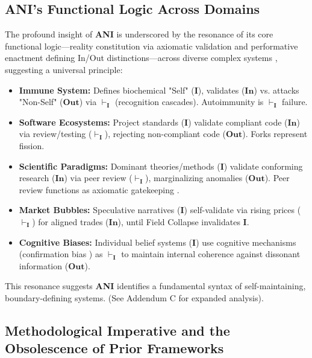 \documentclass{article}
\newcommand{\ANI}{\textbf{ANI}}             %
\newcommand{\Isness}{\mathbf{I}}            %
\newcommand{\Inness}{\mathbf{In}}           %
\newcommand{\Outness}{\mathbf{Out}}         %
\newcommand{\validates}[1]{\ensuremath{\vdash_{#1}}} %
\begin{document}
\subsection{ANI's Functional Logic Across Domains}

The profound insight of \ANI{} is underscored by the resonance of its core functional logic—reality constitution via axiomatic validation and performative enactment defining In/Out distinctions—across diverse complex systems \citep{Bateson1972, Luhmann1995}, suggesting a universal principle:
\begin{itemize}
    \item \textbf{Immune System:} Defines biochemical "Self" ($\Isness$), validates ($\Inness$) vs. attacks "Non-Self" ($\Outness$) via $\validates{\Isness}$ (recognition cascades). Autoimmunity is $\validates{\Isness}$ failure.
    \item \textbf{Software Ecosystems:} Project standards ($\Isness$) validate compliant code ($\Inness$) via review/testing ($\validates{\Isness}$), rejecting non-compliant code ($\Outness$). Forks represent fission.
    \item \textbf{Scientific Paradigms:} Dominant theories/methods ($\Isness$) validate conforming research ($\Inness$) via peer review ($\validates{\Isness}$), marginalizing anomalies ($\Outness$). Peer review functions as axiomatic gatekeeping \citep{Kuhn1962}.
    \item \textbf{Market Bubbles:} Speculative narratives ($\Isness$) self-validate via rising prices ($\validates{\Isness}$) for aligned trades ($\Inness$), until Field Collapse invalidates $\Isness$.
    \item \textbf{Cognitive Biases:} Individual belief systems ($\Isness$) use cognitive mechanisms (confirmation bias \citep{Festinger1956}) as $\validates{\Isness}$ to maintain internal coherence against dissonant information ($\Outness$).
\end{itemize}
This resonance suggests \ANI{} identifies a fundamental syntax of self-maintaining, boundary-defining systems. (See Addendum C for expanded analysis).

\subsection{Methodological Imperative and the Obsolescence of Prior Frameworks}
\end{document}
